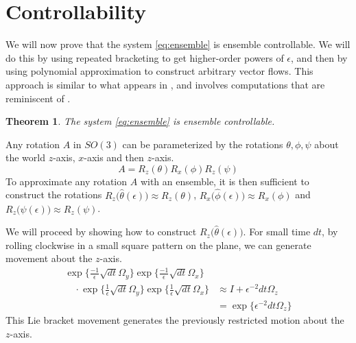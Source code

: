 \documentclass[letter paper, 10pt, conference]{ieeeconf}
\newtheorem{theorem}{Theorem}
\begin{document}
\section{Controllability}\label{sec:Controllability}
We will now prove that the system \eqref{eq:ensemble} is ensemble controllable. We will do this by using repeated bracketing to get higher-order powers of $\epsilon$, and then by using polynomial approximation to construct arbitrary vector flows. This approach is similar to what appears in \cite{Li2009}, and involves computations that are reminiscent of \cite{Lafferriere1993}.
\begin{theorem}
\label{thm:controllable}
The system \eqref{eq:ensemble}  is ensemble controllable.
\end{theorem}
\proof
Any rotation $A$ in $SO(3)$ can be parameterized by the rotations $\theta,\phi,\psi$ about the world $z$-axis, $x$-axis and then $z$-axis.
\[ A = R_z(\theta)R_x(\phi)R_z(\psi) \]
To approximate any rotation $A$ with an ensemble, it is then sufficient to construct the rotations $R_z\!\big(\hat\theta(\epsilon)\big) \approx R_z(\theta)$, $R_x\!\big(\hat\phi(\epsilon)\big) \approx R_x(\phi)$ and $R_z\!\big(\hat\psi(\epsilon)\big)\approx R_z(\psi)$.

We will proceed by showing how to construct $R_z\!\big(\hat\theta(\epsilon)\big)$.
For small time $dt$, by rolling clockwise in a small square pattern on the plane, we can generate movement about the $z$-axis.
\begin{align*}
\exp\{\frac{-1}{\epsilon} \sqrt{dt} \Omega_y\}
  		    \exp\{\frac{-1}{\epsilon} \sqrt{dt} \Omega_x\}&  \\
	\quad \cdot		     \exp\{\frac{1}{\epsilon} \sqrt{dt} \Omega_y\}  
		      \exp\{\frac{1}{\epsilon} \sqrt{dt} \Omega_x\} &\approx  I + \epsilon^{-2} dt \Omega_z\\
	  &=  \exp\{ \epsilon^{-2} dt  \Omega_z\}
	  \end{align*}
This Lie bracket movement generates the previously restricted motion about the $z$-axis.	    
\end{document}
